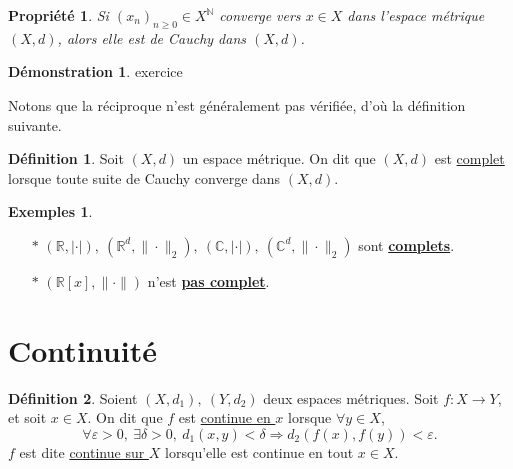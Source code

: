 \documentclass{report}
\newcommand{\reels}{\mathbb{R}}
\newcommand{\naturals}{\mathbb{N}}
\newcommand{\complex}{\mathbb{C}}
\theoremstyle{definition}
\newtheorem{definition}{Définition}
\newtheorem*{demo}{Démonstration}
\newtheorem*{examples}{Exemples}
\theoremstyle{plain}
\newtheorem{property}{Propriété}
\theoremstyle{remark}
\begin{document}
\begin{leftbar}
    \begin{property}
        Si $(x_n)_{n\ge0}\in X^\naturals$ converge vers $x\in X$ dans l'espace
        métrique $(X, d)$, alors elle est de Cauchy dans $(X, d)$.
    \end{property}
\end{leftbar}

\begin{demo}{exercice}
\end{demo}

Notons que la réciproque n'est généralement pas vérifiée, d'où la définition
suivante.

\begin{leftbar}
    \begin{definition}
        Soit $(X, d)$ un espace métrique. On dit que $(X, d)$ est
        \underline{complet} lorsque toute suite de Cauchy converge dans
        $(X, d)$.
    \end{definition}
\end{leftbar}

\begin{examples}
    \begin{itemize}
        \item[$*$]{$(\reels, |\cdot|),\ (\reels^d, \|\cdot\|_2),\ 
            (\complex, |\cdot|),\ (\complex^d, \|\cdot\|_2) $ sont
            \textbf{\underline{complets}}.}
        \item[$*$]{$(\reels[x], \|\cdot\|)$ n'est \textbf{
        \underline{pas complet}}.}
    \end{itemize}
\end{examples}

\vspace{1cm}
\section{Continuité}

\begin{leftbar}
    \begin{definition}
        Soient $(X, d_1),\ (Y, d_2)$ deux espaces métriques. Soit
        $f : X \to Y$, et soit $x\in X$. On dit que $f$ est
        \underline{continue en $x$} lorsque $\forall y\in X$, 
        \begin{equation*}
            \forall\varepsilon > 0,\ \exists\delta > 0,\ 
            d_1(x, y) < \delta \Rightarrow d_2(f(x), f(y)) < \varepsilon.
        \end{equation*}
        $f$ est dite \underline{continue sur $X$} lorsqu'elle est continue
        en tout $x\in X$. 
    \end{definition}
\end{leftbar}
\end{document}
